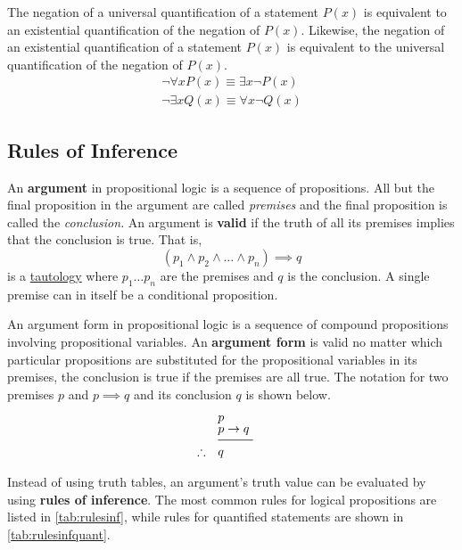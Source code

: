 The negation of a universal quantification of a statement \(P(x)\) is equivalent to an existential quantification of the negation of \(P(x)\). Likewise, the negation of an existential quantification of a statement \(P(x)\) is equivalent to the universal quantification of the negation of \(P(x)\).
\begin{gather*}
\neg \forall x P(x) \equiv \exists x \neg P(x) \\
\neg \exists x Q(x) \equiv \forall x \neg Q(x)
\end{gather*}

\subsection{Rules of Inference}\label{sub:rules_of_inference}
An \textbf{argument} in propositional logic is a sequence of propositions. All but the final proposition in the argument are called \emph{premises} and the final proposition is called the \emph{conclusion}. An argument is \textbf{valid} if the truth of all its premises implies that the conclusion is true. That is, \[
	(p_1 \wedge p_2 \wedge \ldots \wedge p_n) \implies q
\]
is a \hyperref[ssec:equiv]{tautology} where \(p_1 \ldots p_n\) are the premises and \(q\) is the conclusion. A single premise can in itself be a conditional proposition.

An argument form in propositional logic is a sequence of compound propositions involving propositional variables. An \textbf{argument form} is valid no matter which particular propositions are substituted for the propositional variables in its premises, the conclusion is true if the premises are all true. The notation for two premises \(p\) and \(p \implies q \) and its conclusion \(q\) is shown below.
\begin{equation*}
\setlength{\jot}{-0.1cm}
\begin{aligned}
&p &\\
&p \implies q & \\
&\rule[0.1cm]{1cm}{0.5pt} & \\
\therefore \quad &  q & \\
\end{aligned}
\end{equation*}


Instead of using truth tables, an argument's truth value can be evaluated by using \textbf{rules of inference}. The most common rules for logical propositions are listed in \autoref{tab:rulesinf}, while rules for quantified statements are shown in \autoref{tab:rulesinfquant}.

